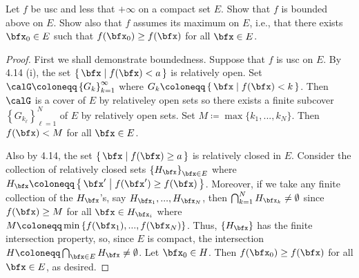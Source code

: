 \begin{problem}
Let $f$ be usc and less that $+\infty$ on a compact set $E$. Show that $f$
is bounded above on $E$. Show also that $f$ assumes its maximum on $E$,
i.e., that there exists $\bfx_0\in E$ such that $f(\bfx_0)\geq f(\bfx)$ for
all $\bfx\in E$.
\end{problem}
\begin{proof}
First we shall demonstrate boundedness. Suppose that $f$ is usc on $E$. By
4.14 (i), the set $\left\{\,\bfx\;\middle|\;f(\bfx)<a\,\right\}$ is
relatively open. Set $\calG\coloneqq\left\{G_k\right\}_{k=1}^\infty$ where
$G_k\coloneqq\left\{\,\bfx\;\middle|\;f(\bfx)<k\,\right\}$. Then $\calG$ is
a cover of $E$ by relativeley open sets so there exists a finite subcover
$\left\{G_{k_\ell}\right\}_{\ell=1}^N$ of $E$ by relatively open sets. Set
$M\coloneqq\max\{k_1,...,k_N\}$. Then $f(\bfx)<M$ for all $\bfx\in E$.

Also by 4.14, the set $\left\{\,\bfx\;\middle|\;f(\bfx)\geq a\,\right\}$ is
relatively closed in $E$. Consider the collection of relatively closed sets
$\left\{H_\bfx\right\}_{\bfx\in E}$ where
$H_\bfx\coloneqq\left\{\,\bfx'\;\middle|\;f(\bfx')\geq
  f(\bfx)\,\right\}$. Moreover, if we take any finite collection of the
$H_\bfx$'s, say $H_{\bfx_1},...,H_{\bfx_N}$, then
$\bigcap_{k=1}^N H_{\bfx_k}\neq\emptyset$ since $f(\bfx)\geq M$ for all
$\bfx\in H_{\bfx_i}$ where
$M\coloneqq\min\left\{f(\bfx_1),...,f(\bfx_N)\right\}$. Thus,
$\left\{H_\bfx\right\}$ has the finite intersection property, so, since $E$
is compact, the intersection $H\coloneqq \bigcap_{\bfx\in E}
H_\bfx\neq\emptyset$. Let $\bfx_0\in H$. Then $f(\bfx_0)\geq f(\bfx)$ for
all $\bfx\in E$, as desired.
\end{proof}
\newpage

